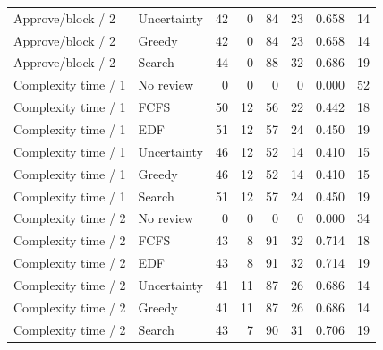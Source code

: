 \begin{table}[t]
\begin{tabular}{llrrrrrr}
Approve/block / 2 & Uncertainty & 42 & 0 & 84 & 23 & 0.658 & 14 \\
Approve/block / 2 & Greedy & 42 & 0 & 84 & 23 & 0.658 & 14 \\
Approve/block / 2 & Search & 44 & 0 & 88 & 32 & 0.686 & 19 \\
Complexity time / 1 & No review & 0 & 0 & 0 & 0 & 0.000 & 52 \\
Complexity time / 1 & FCFS & 50 & 12 & 56 & 22 & 0.442 & 18 \\
Complexity time / 1 & EDF & 51 & 12 & 57 & 24 & 0.450 & 19 \\
Complexity time / 1 & Uncertainty & 46 & 12 & 52 & 14 & 0.410 & 15 \\
Complexity time / 1 & Greedy & 46 & 12 & 52 & 14 & 0.410 & 15 \\
Complexity time / 1 & Search & 51 & 12 & 57 & 24 & 0.450 & 19 \\
Complexity time / 2 & No review & 0 & 0 & 0 & 0 & 0.000 & 34 \\
Complexity time / 2 & FCFS & 43 & 8 & 91 & 32 & 0.714 & 18 \\
Complexity time / 2 & EDF & 43 & 8 & 91 & 32 & 0.714 & 19 \\
Complexity time / 2 & Uncertainty & 41 & 11 & 87 & 26 & 0.686 & 14 \\
Complexity time / 2 & Greedy & 41 & 11 & 87 & 26 & 0.686 & 14 \\
Complexity time / 2 & Search & 43 & 7 & 90 & 31 & 0.706 & 19 \\
\bottomrule
\end{tabular}
\end{table}

